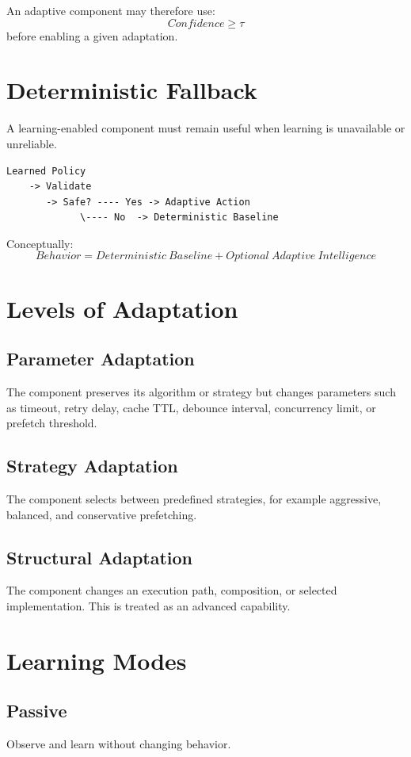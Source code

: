 \documentclass[11pt,a4paper]{article}
\begin{document}
An adaptive component may therefore use:
\[
Confidence \geq \tau
\]
before enabling a given adaptation.

\section{Deterministic Fallback}
A learning-enabled component must remain useful when learning is unavailable or unreliable.

\begin{lstlisting}
Learned Policy
    -> Validate
       -> Safe? ---- Yes -> Adaptive Action
             \---- No  -> Deterministic Baseline
\end{lstlisting}

Conceptually:
\[
Behavior=Deterministic\ Baseline+Optional\ Adaptive\ Intelligence
\]

\section{Levels of Adaptation}
\subsection{Parameter Adaptation}
The component preserves its algorithm or strategy but changes parameters such as timeout, retry delay, cache TTL, debounce interval, concurrency limit, or prefetch threshold.

\subsection{Strategy Adaptation}
The component selects between predefined strategies, for example aggressive, balanced, and conservative prefetching.

\subsection{Structural Adaptation}
The component changes an execution path, composition, or selected implementation. This is treated as an advanced capability.

\section{Learning Modes}
\subsection{Passive}
Observe and learn without changing behavior.
\end{document}
